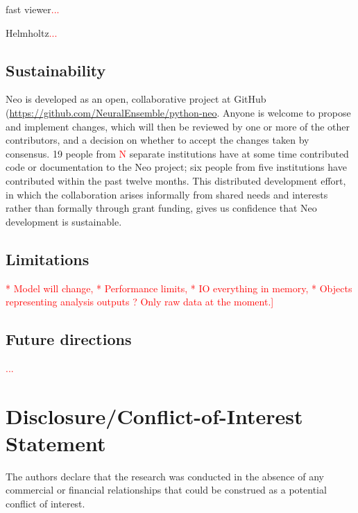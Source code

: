 \documentclass{frontiers}
\newcommand{\missing}[1]{\textcolor{red}{#1}}
\begin{document}
fast viewer\missing{...}

Helmholtz\missing{...}


\subsection{Sustainability}

Neo is developed as an open, collaborative project at GitHub (\url{https://github.com/NeuralEnsemble/python-neo}.
Anyone is welcome to propose and implement changes, which will then be reviewed by one or more of the other contributors, and a decision on whether to accept the changes taken by consensus.
19 people from \missing{N} separate institutions have at some time contributed code or documentation to the Neo project;  six people from five institutions have contributed within the past twelve months.
This distributed development effort, in which the collaboration arises informally from shared needs and interests rather than formally through grant funding, gives us confidence that Neo development is sustainable.


\subsection{Limitations}
\missing{* Model will change, * Performance limits, * IO everything in memory, * Objects representing analysis outputs ? Only raw data at the moment.]}


\subsection{Future directions}

\missing{...}


\section*{Disclosure/Conflict-of-Interest Statement}
The authors declare that the research was conducted in the absence of any commercial or financial relationships that could be construed as a potential conflict of interest.
\end{document}
